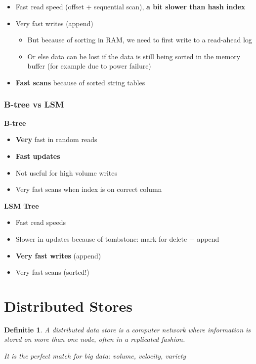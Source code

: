 \documentclass{article}
\newtheorem{theorem}{Definitie}[section]
\begin{document}
\begin{itemize}
    \item Fast read speed (offset + sequential scan), \textbf{a bit slower than hash index}
    \item Very fast writes (append)
    \begin{itemize}
        \item But because of sorting in RAM, we need to first write to a read-ahead log
        \item Or else data can be lost if the data is still being sorted in the memory buffer (for example due to power failure)
    \end{itemize}
    \item \textbf{Fast scans} because of sorted string tables
\end{itemize}

\subsubsection{B-tree vs LSM}

\textbf{B-tree}

\begin{itemize}
    \item \textbf{Very} fast in random reads
    \item \textbf{Fast updates}
    \item Not useful for high volume writes
    \item Very fast scans when index is on correct column
\end{itemize}

\textbf{LSM Tree}

\begin{itemize}
    \item Fast read speeds
    \item Slower in updates because of tombstone: mark for delete + append
    \item \textbf{Very fast writes} (append)
    \item Very fast scans (sorted!)
\end{itemize}

\section{Distributed Stores}

\begin{theorem}
    A distributed data store is a computer network where information is stored on 
    more than one node, often in a replicated fashion.

    It is the perfect match for big data: volume, velocity, variety
\end{theorem}
\end{document}
